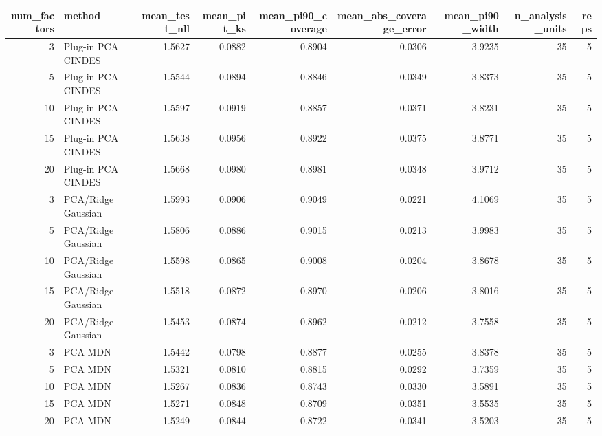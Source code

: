 \begin{tabular}{rlrrrrrrr}
\toprule
num\_factors & method & mean\_test\_nll & mean\_pit\_ks & mean\_pi90\_coverage & mean\_abs\_coverage\_error & mean\_pi90\_width & n\_analysis\_units & reps \\
\midrule
3 & Plug-in PCA CINDES & 1.5627 & 0.0882 & 0.8904 & 0.0306 & 3.9235 & 35 & 5 \\
5 & Plug-in PCA CINDES & 1.5544 & 0.0894 & 0.8846 & 0.0349 & 3.8373 & 35 & 5 \\
10 & Plug-in PCA CINDES & 1.5597 & 0.0919 & 0.8857 & 0.0371 & 3.8231 & 35 & 5 \\
15 & Plug-in PCA CINDES & 1.5638 & 0.0956 & 0.8922 & 0.0375 & 3.8771 & 35 & 5 \\
20 & Plug-in PCA CINDES & 1.5668 & 0.0980 & 0.8981 & 0.0348 & 3.9712 & 35 & 5 \\
3 & PCA/Ridge Gaussian & 1.5993 & 0.0906 & 0.9049 & 0.0221 & 4.1069 & 35 & 5 \\
5 & PCA/Ridge Gaussian & 1.5806 & 0.0886 & 0.9015 & 0.0213 & 3.9983 & 35 & 5 \\
10 & PCA/Ridge Gaussian & 1.5598 & 0.0865 & 0.9008 & 0.0204 & 3.8678 & 35 & 5 \\
15 & PCA/Ridge Gaussian & 1.5518 & 0.0872 & 0.8970 & 0.0206 & 3.8016 & 35 & 5 \\
20 & PCA/Ridge Gaussian & 1.5453 & 0.0874 & 0.8962 & 0.0212 & 3.7558 & 35 & 5 \\
3 & PCA MDN & 1.5442 & 0.0798 & 0.8877 & 0.0255 & 3.8378 & 35 & 5 \\
5 & PCA MDN & 1.5321 & 0.0810 & 0.8815 & 0.0292 & 3.7359 & 35 & 5 \\
10 & PCA MDN & 1.5267 & 0.0836 & 0.8743 & 0.0330 & 3.5891 & 35 & 5 \\
15 & PCA MDN & 1.5271 & 0.0848 & 0.8709 & 0.0351 & 3.5535 & 35 & 5 \\
20 & PCA MDN & 1.5249 & 0.0844 & 0.8722 & 0.0341 & 3.5203 & 35 & 5 \\
\bottomrule
\end{tabular}
